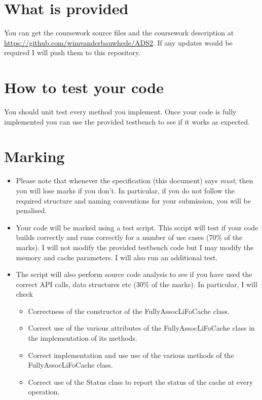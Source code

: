 \documentclass[11pt]{article}
\begin{document}
\section{What is provided}\label{what-is-provided}

You can get the coursework source files and the coursework description at \url{https://github.com/wimvanderbauwhede/ADS2}. If any updates would be required I will push them to this repository.


\section{How to test your code}\label{how-to-test-your-code}

You should unit test every method you implement. Once your code is fully implemented you can use the provided testbench to see if it works as expected.

\section{Marking}\label{marking}


\begin{itemize}
\item Please note that whenever the specification (this document) says \emph{must}, then you will lose marks if you don't. In particular, if you do not follow the required structure and naming conventions for your submission, you will be penalised.  

\item Your code will be marked using a test script. This script will test if your code builds correctly and runs correctly for a number of use cases (70\% of the marks). I will not modify the provided testbench code but I may modify the memory and cache parameters. I will also run an additional test. 
\item The script will also perform source code analysis to see if you have used the correct API calls, data structures etc (30\% of the marks).  In particular, I will check
\begin{itemize}
\item Correctness of the constructor of the FullyAssocLiFoCache class.
\item Correct use of the various attributes of the FullyAssocLiFoCache class in the implementation of its methods.
\item Correct implementation and use use of the various methods of the FullyAssocLiFoCache class.
\item Correct use of the Status class to report the status of the cache at every operation.
\end{itemize}
\end{itemize}
\end{document}
